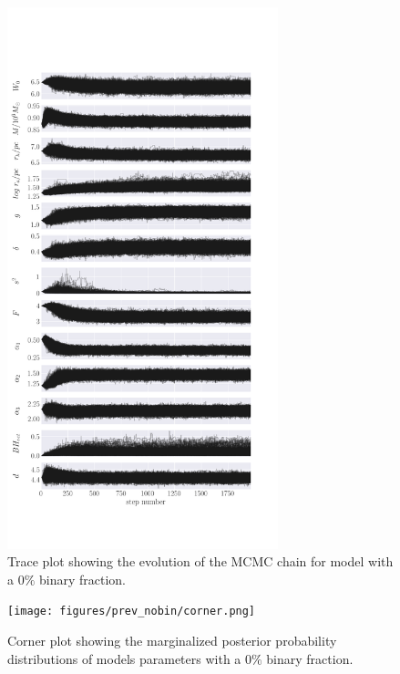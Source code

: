 
\begin{figure}
	\centering
	\includegraphics[width=0.7\textwidth]{figures/prev_nobin/walkers.png}
	\caption{Trace plot showing the evolution of the MCMC chain for model with a $0\%$ binary
		fraction.}
	\label{fig:nobin_walkers}
\end{figure}

\begin{figure}
	\centering
	\texttt{[image: figures/prev\_nobin/corner.png]}
	\caption{Corner plot showing the marginalized posterior probability distributions of models
		parameters with a $0\%$ binary fraction.}
	\label{fig:nobin_corner}
\end{figure}


